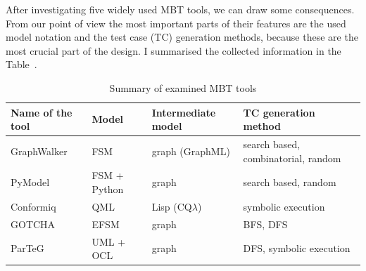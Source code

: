 After investigating five widely used MBT tools, we can draw some consequences. From our point of view the most important parts of their features are the used model notation and the test case (TC) generation methods, because these are the most crucial part of the design. I summarised the collected information in the Table~\cite{tab:toolsummary}.

\begin{table}[htb]
\begin{center}
\begin{tabular}{|l|l|l|l|}
\hline
	\textbf{Name of the tool} & \textbf{Model} & \textbf{Intermediate model} & \textbf{TC generation method}\\\hline
	GraphWalker & FSM & graph (GraphML) & search based, combinatorial, random\\\hline
	PyModel & FSM + Python & graph & search based, random\\\hline
	Conformiq & QML & Lisp (CQ$\lambda$) & symbolic execution\\\hline
	GOTCHA & EFSM & graph & BFS, DFS\\\hline
	ParTeG & UML + OCL & graph & DFS, symbolic execution\\
\hline
\end{tabular}
\end{center}
\caption{\label{tab:toolssummary} Summary of examined MBT tools}
\end{table}


